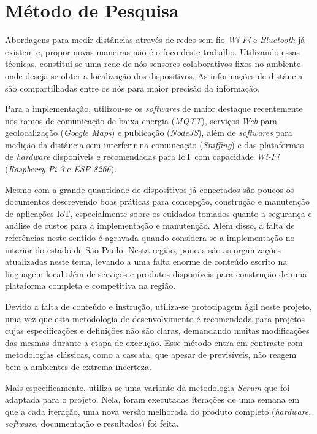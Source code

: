 
\chapter{Método de Pesquisa}
\label{chap:Método de Pesquisa}

Abordagens para medir distâncias através de redes sem fio \emph{Wi-Fi}
\cite{bahillo2009ieee} e \emph{Bluetooth} já existem e, propor novas maneiras
não é o foco deste trabalho. Utilizando essas técnicas, constitui-se uma
rede de nós sensores colaborativos fixos no ambiente onde deseja-se obter a
localização dos dispositivos. As informações de distância são compartilhadas
entre os nós para maior precisão da informação.

Para a implementação, utilizou-se os \emph{softwares} de maior
destaque recentemente nos ramos de comunicação de baixa energia (\emph{MQTT}),
serviços \emph{Web} para geolocalização (\emph{Google Maps}) e publicação
(\emph{NodeJS}), além de \emph{softwares} para medição da distância sem
interferir na comuncação (\emph{Sniffing}) e das plataformas de
\emph{hardware} disponíveis e recomendadas para IoT com capacidade
\emph{Wi-Fi} (\emph{Raspberry Pi 3} e \emph{ESP-8266}).

Mesmo com a grande quantidade de dispositivos já conectados são poucos os
documentos descrevendo boas práticas para concepção, construção e manutenção de
aplicações IoT, especialmente sobre os cuidados tomados quanto a segurança e
análise de custos para a implementação e manutenção. Além
disso, a falta de referências neste sentido é agravada quando considera-se a
implementação no interior do estado de São Paulo. Nesta região, poucas são as
organizações atualizadas neste tema, levando a uma falta enorme de conteúdo
escrito na linguagem local além de serviços e produtos disponíveis para
construção de uma plataforma completa e competitiva na região.

Devido a falta de conteúdo e instrução, utiliza-se prototipagem ágil neste
projeto, uma vez que esta metodologia de desenvolvimento é recomendada para
projetos cujas especificações e definições não são claras, demandando muitas
modificações das mesmas durante a etapa de execução. Esse método entra em
contraste com metodologias clássicas, como a cascata, que apesar de previsíveis,
não reagem bem a ambientes de extrema incerteza.

Mais especificamente, utiliza-se uma variante da metodologia \emph{Scrum}
\cite{James2016} que foi adaptada para o projeto. Nela, foram executadas
iterações de uma semana em que a cada iteração, uma nova versão melhorada do
produto completo (\emph{hardware}, \emph{software}, documentação e
resultados) foi feita.

